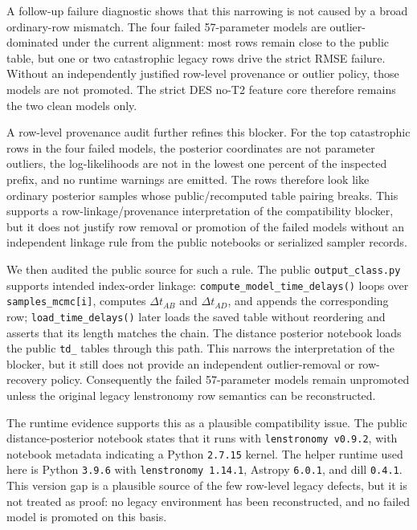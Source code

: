\documentclass[11pt]{article}
\begin{document}
A follow-up failure diagnostic shows that this narrowing is not caused by a
broad ordinary-row mismatch.  The four failed 57-parameter models are
outlier-dominated under the current alignment: most rows remain close to the
public table, but one or two catastrophic legacy rows drive the strict RMSE
failure.  Without an independently justified row-level provenance or outlier
policy, those models are not promoted.  The strict DES no-T2 feature core
therefore remains the two clean models only.

A row-level provenance audit further refines this blocker.  For the top
catastrophic rows in the four failed models, the posterior coordinates are not
parameter outliers, the log-likelihoods are not in the lowest one percent of
the inspected prefix, and no runtime warnings are emitted.  The rows therefore
look like ordinary posterior samples whose public/recomputed table pairing
breaks.  This supports a row-linkage/provenance interpretation of the
compatibility blocker, but it does not justify row removal or promotion of the
failed models without an independent linkage rule from the public notebooks or
serialized sampler records.

We then audited the public source for such a rule.  The public
\texttt{output\_class.py} supports intended index-order linkage:
\texttt{compute\_model\_time\_delays()} loops over \texttt{samples\_mcmc[i]},
computes \(\Delta t_{AB}\) and \(\Delta t_{AD}\), and appends the corresponding
row; \texttt{load\_time\_delays()} later loads the saved table without
reordering and asserts that its length matches the chain.  The distance
posterior notebook loads the public \texttt{td\_} tables through this path.
This narrows the interpretation of the blocker, but it still does not provide
an independent outlier-removal or row-recovery policy.  Consequently the failed
57-parameter models remain unpromoted unless the original legacy lenstronomy
row semantics can be reconstructed.

The runtime evidence supports this as a plausible compatibility issue.  The
public distance-posterior notebook states that it runs with
\texttt{lenstronomy v0.9.2}, with notebook metadata indicating a Python
\texttt{2.7.15} kernel.  The helper runtime used here is Python \texttt{3.9.6}
with \texttt{lenstronomy 1.14.1}, Astropy \texttt{6.0.1}, and dill
\texttt{0.4.1}.  This version gap is a plausible source of the few row-level
legacy defects, but it is not treated as proof: no legacy environment has been
reconstructed, and no failed model is promoted on this basis.
\end{document}

